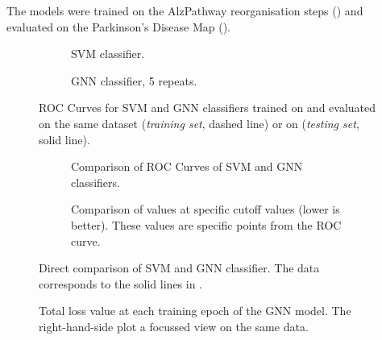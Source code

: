 \documentclass[
	fontsize=10pt, %
	twoside=false, %
	secnumdepth=1, %
]{kaobook}
\begin{document}
The models were trained on the AlzPathway reorganisation steps (\ADMap)
and evaluated on the Parkinson's Disease Map (\PDMap). 

\begin{figure}[h]
  \centering
  \begin{subfigure}[h]{0.49\linewidth}
    \caption{SVM classifier.}
  \end{subfigure}
  \begin{subfigure}[h]{0.49\linewidth}
    \caption{GNN classifier, 5 repeats.  }
  \end{subfigure}
  \caption{ROC Curves for SVM and GNN classifiers trained on \ADMap
    and evaluated on the same dataset (\textit{training set}, dashed line) or on \PDMap
    (\textit{testing set}, solid line).}
  \label{fig:svm-repro-comparison}
\end{figure}
%
\begin{figure}[h]
  \centering
  \begin{subfigure}[h]{0.49\linewidth}
    \caption{Comparison of ROC Curves of SVM and GNN classifiers.}
  \end{subfigure}
  \begin{subfigure}[h]{0.49\linewidth}
    \caption{Comparison of \FPR values at specific \TPR cutoff values (lower is better). These
      values are specific points from the ROC curve.}
  \end{subfigure}
  \caption{Direct comparison of SVM and GNN classifier. The data
    corresponds to the solid lines in .}
  \label{fig:svm-repro-roc-train-test}
\end{figure}


\begin{figure}[h]
  \centering
  \begin{subfigure}[h]{0.49\linewidth}
  \end{subfigure}
  \begin{subfigure}[h]{0.49\linewidth}
  \end{subfigure}
  \caption{Total loss value at each training epoch of the GNN model. The right-hand-side plot a
    focussed view on the same data.}
  \label{fig:svm-repro-loss}
\end{figure}
\end{document}
